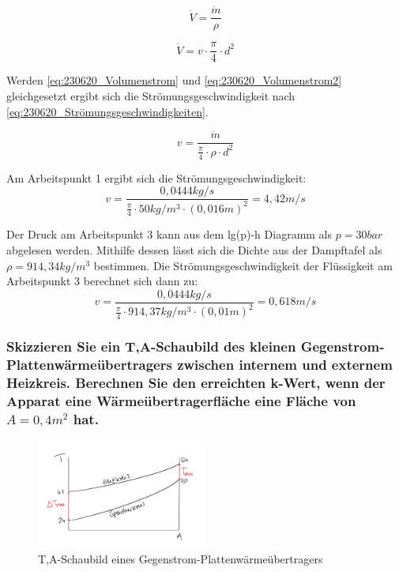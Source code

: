 \begin{equation}
    \dot{V}= \frac{\dot{m}}{\rho }
    \label{eq:230620_Volumenstrom}
\end{equation}

\begin{equation}
    \dot{V}= v \cdot \frac{\pi}{4} \cdot d^2
    \label{eq:230620_Volumenstrom2}
\end{equation}

Werden \autoref{eq:230620_Volumenstrom} und \autoref{eq:230620_Volumenstrom2} gleichgesetzt ergibt sich die Strömungsgeschwindigkeit nach \autoref{eq:230620_Strömungsgeschwindigkeiten}.

\begin{equation}
    v = \frac{\dot{m}}{\frac{\pi}{4}\cdot \rho \cdot d^2}
    \label{eq:230620_Strömungsgeschwindigkeiten}
\end{equation}

Am Arbeitspunkt 1 ergibt sich die Strömungsgeschwindigkeit:
$$v=\frac{0,0444 kg/s}{\frac{\pi}{4}\cdot 50 kg/m^3 \cdot (0,016 m)^2}=4,42 m/s $$

Der Druck am Arbeitspunkt 3 kann aus dem lg(p)-h Diagramm als $p=30 bar$ abgelesen werden. Mithilfe dessen lässt sich die Dichte aus der Dampftafel als $\rho=914,34 kg/m^3$ bestimmen.
Die Strömungsgeschwindigkeit der Flüssigkeit am Arbeitspunkt 3 berechnet sich dann zu:
$$v=\frac{0,0444 kg/s}{\frac{\pi}{4}\cdot 914,37 kg/m^3 \cdot (0,01 m)^2}=0,618 m/s $$

\subsubsection{Skizzieren Sie ein T,A-Schaubild des kleinen Gegenstrom-Plattenwärmeübertragers
zwischen internem und externem Heizkreis. Berechnen Sie den erreichten k-Wert,
wenn der Apparat eine Wärmeübertragerfläche eine Fläche von \texorpdfstring{$A = 0,4 m^2$}{} hat.}

\begin{figure}[!h]
    \centering
    \includegraphics[width=0.5\textwidth]{Abbildungen/TA_Diagramm.jpg}
    \caption{T,A-Schaubild eines Gegenstrom-Plattenwärmeübertragers}
    \label{fig:TA,Diagramm}
\end{figure}

